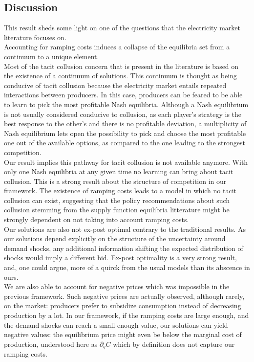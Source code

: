 \subsection{Discussion}

This result sheds some light on one of the questions that the electricity market literature focuses on. \\

Accounting for ramping costs induces a collapse of the equilibria set from a continuum to a unique element. \\

Most of the tacit collusion concern that is present in the literature is based on the existence of a continuum of solutions. This continuum is thought as being conducive of tacit collusion because the electricity market entails repeated interactions between producers. In this case, producers can be feared to be able to learn to pick the most profitable Nash equilibria. Although a Nash equilibrium is not usually considered conducive to collusion, as each player's strategy is the best response to the other's and there is no profitable deviation, a multiplicity of Nash equilibrium lets open the possibility to pick and choose the most profitable one out of the available options, as compared to the one leading to the strongest competition.\\

Our result implies this pathway for tacit collusion is not available anymore. With only one Nash equilibria at any given time no learning can bring about tacit collusion. This is a strong result about the structure of competition in our framework. The existence of ramping costs leads to a model in which no tacit collusion can exist, suggesting that the policy recommendations about such collusion stemming from the supply function equilibria litterature might be strongly dependent on not taking into account ramping costs.\\

Our solutions are also not ex-post optimal contrary to the traditional results. As our solutions depend explicitly on the structure of the uncertainty around demand shocks, any additional information shifting the expected distribution of shocks would imply a different bid. Ex-post optimality is a very strong result, and, one could argue, more of a quirck from the usual models than its abscence in ours.\\

We are also able to account for negative prices which was impossible in the previous framework. Such negative prices are actually observed, although rarely, on the market: producers prefer to subsidize consumption instead of decreasing production by a lot. In our framework, if the ramping costs are large enough, and the demand shocks can reach a small enough value, our solutions can yield negative values: the equilibrium price might even be below the marginal cost of production, understood here as $\partial_q C$ which by definition does not capture our ramping costs.\\

